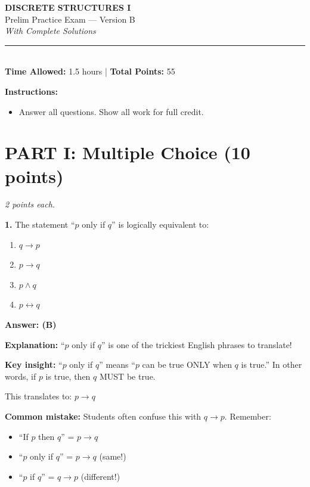 \documentclass[11pt,a4paper]{article}
\begin{document}
\begin{center}
{\LARGE\textbf{DISCRETE STRUCTURES I}}\\[5pt]
{\Large Prelim Practice Exam --- Version B}\\[5pt]
{\large\textit{With Complete Solutions}}\\[10pt]
\rule{0.8\textwidth}{0.5pt}\\[5pt]
\textbf{Time Allowed:} 1.5 hours \quad | \quad \textbf{Total Points:} 55
\end{center}

\vspace{10pt}

\noindent\textbf{Instructions:}
\begin{itemize}[noitemsep]
    \item Answer all questions. Show all work for full credit.
\end{itemize}

\vspace{15pt}

\section*{PART I: Multiple Choice (10 points)}
\textit{2 points each.}

\vspace{8pt}

\textbf{1.} The statement ``$p$ only if $q$'' is logically equivalent to:

\begin{enumerate}[label=(\Alph*),noitemsep]
    \item $q \to p$
    \item $p \to q$
    \item $p \land q$
    \item $p \leftrightarrow q$
\end{enumerate}

\begin{solnbox}
\textbf{Answer: (B)}

\textbf{Explanation:} ``$p$ only if $q$'' is one of the trickiest English phrases to translate!

\textbf{Key insight:} ``$p$ only if $q$'' means ``$p$ can be true ONLY when $q$ is true.'' In other words, if $p$ is true, then $q$ MUST be true.

This translates to: $p \to q$

\textbf{Common mistake:} Students often confuse this with $q \to p$. Remember:
\begin{itemize}[noitemsep]
    \item ``If $p$ then $q$'' = $p \to q$
    \item ``$p$ only if $q$'' = $p \to q$ (same!)
    \item ``$p$ if $q$'' = $q \to p$ (different!)
\end{itemize}
\end{solnbox}
\end{document}
